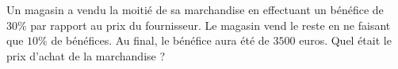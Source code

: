 
\begin{exercice}\label{exoPremiere-0007}

Un magasin a vendu la moitié de sa marchandise en effectuant un bénéfice de \( 30\%\) par rapport au prix du fournisseur. Le magasin vend le reste en ne faisant que \( 10\%\) de bénéfices. Au final, le bénéfice aura été de \( 3500\) euros. Quel était le prix d'achat de la marchandise ?

\end{exercice}
